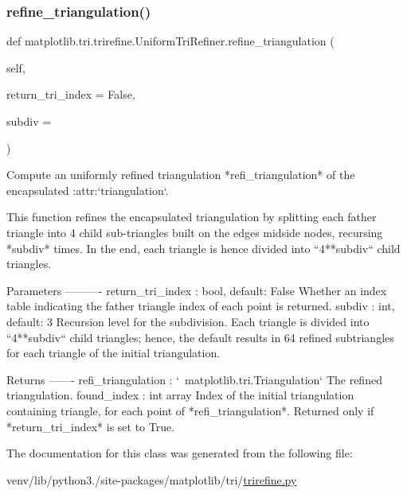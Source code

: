 \subsubsection{\texorpdfstring{refine\+\_\+triangulation()}{refine\_triangulation()}}
{\footnotesize\ttfamily def matplotlib.\+tri.\+trirefine.\+Uniform\+Tri\+Refiner.\+refine\+\_\+triangulation (\begin{DoxyParamCaption}\item[{}]{self,  }\item[{}]{return\+\_\+tri\+\_\+index = {\ttfamily False},  }\item[{}]{subdiv = {} }\end{DoxyParamCaption})}

\begin{DoxyVerb}Compute an uniformly refined triangulation *refi_triangulation* of
the encapsulated :attr:`triangulation`.

This function refines the encapsulated triangulation by splitting each
father triangle into 4 child sub-triangles built on the edges midside
nodes, recursing *subdiv* times.  In the end, each triangle is hence
divided into ``4**subdiv`` child triangles.

Parameters
----------
return_tri_index : bool, default: False
    Whether an index table indicating the father triangle index of each
    point is returned.
subdiv : int, default: 3
    Recursion level for the subdivision.
    Each triangle is divided into ``4**subdiv`` child triangles;
    hence, the default results in 64 refined subtriangles for each
    triangle of the initial triangulation.

Returns
-------
refi_triangulation : `~matplotlib.tri.Triangulation`
    The refined triangulation.
found_index : int array
    Index of the initial triangulation containing triangle, for each
    point of *refi_triangulation*.
    Returned only if *return_tri_index* is set to True.
\end{DoxyVerb}
 

The documentation for this class was generated from the following file\+:\begin{DoxyCompactItemize}
\item 
venv/lib/python3./site-\/packages/matplotlib/tri/\hyperlink{trirefine_8py}{trirefine.\+py}\end{DoxyCompactItemize}
